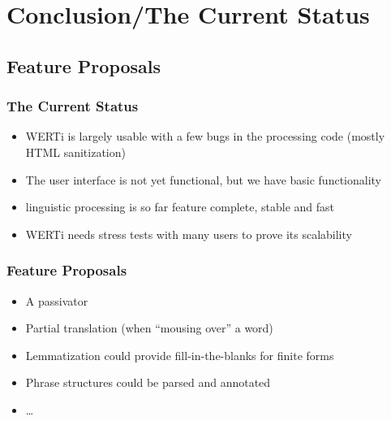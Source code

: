 \documentclass{beamer}
\begin{document}
\section{Conclusion/The Current Status} \subsection{Feature Proposals}
\begin{frame}
  \frametitle{The Current Status}
  \begin{itemize}
    \item WERTi is largely usable with a few bugs in the processing code (mostly
      HTML sanitization)\pause
    \item The user interface is not yet functional, but we have basic
      functionality\pause
    \item linguistic processing is so far feature complete, stable and
      fast\pause
    \item WERTi needs stress tests with many users to prove its
      scalability\pause
  \end{itemize}
\end{frame}
\begin{frame}
  \frametitle{Feature Proposals}
  \begin{itemize}
    \item A passivator\pause
    \item Partial translation (when ``mousing over'' a word)\pause
    \item Lemmatization could provide fill-in-the-blanks for finite forms\pause
    \item Phrase structures could be parsed and annotated\pause
    \item \ldots{}
  \end{itemize}
\end{frame}
\end{document}
